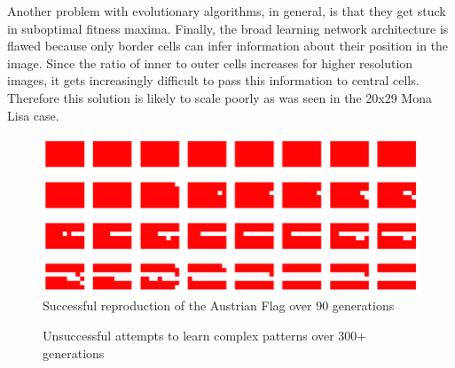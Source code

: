Another problem with evolutionary algorithms, in general, is that they get stuck in suboptimal fitness maxima.
Finally, the broad learning network architecture is flawed because only border cells can infer information about their position in the image.
Since the ratio of inner to outer cells increases for higher resolution images, it gets increasingly difficult to pass this information to central cells.
Therefore this solution is likely to scale poorly as was seen in the 20x29 Mona Lisa case. \\

\begin{figure}[!h]
    \centering
    \includegraphics[width=5in]{images/austria-flag.png}
    \caption{Successful reproduction of the Austrian Flag over 90 generations \cite{elmenreich2011evolving}}
    \label{fig:austria-flag}
\end{figure}

\begin{figure}[htp] 
    \centering
    \hfill%
    \caption{Unsuccessful attempts to learn complex patterns over 300+ generations}
\end{figure}

